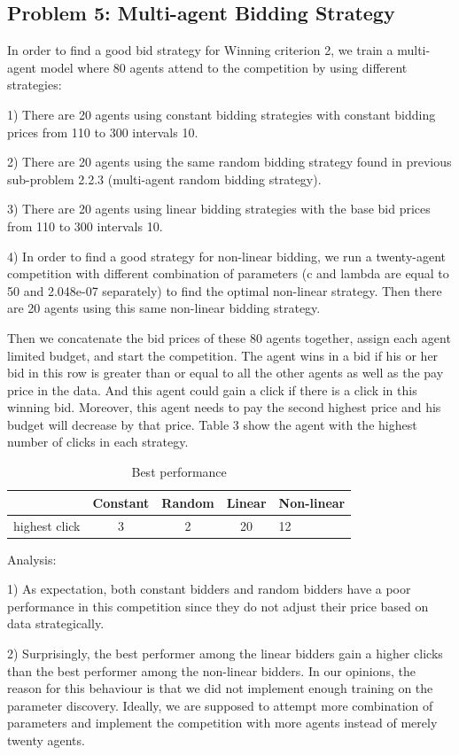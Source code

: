 \documentclass{sig-alternate-05-2015}
\begin{document}
\subsection{Problem 5: Multi-agent Bidding Strategy}

In order to find a good bid strategy for Winning criterion 2, we train a multi-agent model where 80 agents attend to the competition by using different strategies:

1)	There are 20 agents using constant bidding strategies with constant bidding prices from 110 to 300 intervals 10.

2)	There are 20 agents using the same random bidding strategy found in previous sub-problem 2.2.3 (multi-agent random bidding strategy).

3)	There are 20 agents using linear bidding strategies with the base bid prices from 110 to 300 intervals 10.

4)	In order to find a good strategy for non-linear bidding, we run a twenty-agent competition with different combination of parameters (c and lambda are equal to 50 and 2.048e-07 separately) to find the optimal non-linear strategy. Then there are 20 agents using this same non-linear bidding strategy.

Then we concatenate the bid prices of these 80 agents together, assign each agent limited budget, and start the competition. The agent wins in a bid if his or her bid in this row is greater than or equal to all the other agents as well as the pay price in the data. And this agent could gain a click if there is a click in this winning bid. Moreover, this agent needs to pay the second highest price and his budget will decrease by that price. Table 3 show the agent with the highest number of clicks in each strategy.

\begin{table}
\centering
\caption{Best performance}
\begin{tabular}{|c|c|c|c|l|} \hline
&Constant &Random &Linear&Non-linear\\ \hline
highest click&3&2&20&12\\
\hline\end{tabular}
\end{table}

Analysis:

1)	As expectation, both constant bidders and random bidders have a poor performance in this competition since they do not adjust their price based on data strategically.

2)	Surprisingly, the best performer among the linear bidders gain a higher clicks than the best performer among the non-linear bidders. In our opinions, the reason for this behaviour is that we did not implement enough training on the parameter discovery. Ideally, we are supposed to attempt more combination of parameters and implement the competition with more agents instead of merely twenty agents.
\end{document}
